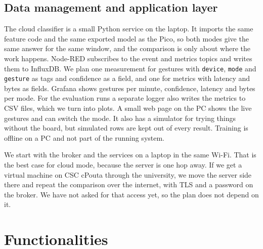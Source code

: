 \documentclass{article}
\begin{document}
\subsection{Data management and application layer}

The cloud classifier is a small Python service on the laptop. It imports the same feature code and the same exported model as the Pico, so both modes give the same answer for the same window, and the comparison is only about where the work happens. Node-RED subscribes to the event and metrics topics and writes them to InfluxDB. We plan one measurement for gestures with \texttt{device}, \texttt{mode} and \texttt{gesture} as tags and confidence as a field, and one for metrics with latency and bytes as fields. Grafana shows gestures per minute, confidence, latency and bytes per mode. For the evaluation runs a separate logger also writes the metrics to CSV files, which we turn into plots. A small web page on the PC shows the live gestures and can switch the mode. It also has a simulator for trying things without the board, but simulated rows are kept out of every result. Training is offline on a PC and not part of the running system.

We start with the broker and the services on a laptop in the same Wi-Fi. That is the best case for cloud mode, because the server is one hop away. If we get a virtual machine on CSC cPouta through the university, we move the server side there and repeat the comparison over the internet, with TLS and a password on the broker. We have not asked for that access yet, so the plan does not depend on it.

\section{Functionalities}
\end{document}
